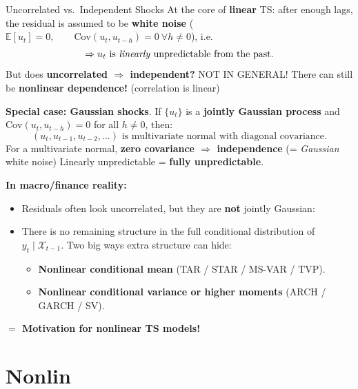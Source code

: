 \documentclass{beamer}
\begin{document}
\begin{frame}{Uncorrelated vs.\ Independent Shocks}
\footnotesize
At the core of \textbf{linear} TS: after enough lags, the residual is assumed to be \textbf{white noise} ($\mathbb{E}[u_t]=0, \qquad \text{Cov}(u_t,u_{t-h})=0 \ \forall h\neq 0$), i.e.
 \[
    \Rightarrow u_t \text{ is \emph{linearly} unpredictable from the past.}
  \]
But does \textbf{uncorrelated $\Rightarrow$ independent? }\pause NOT IN GENERAL! There can still be \textbf{nonlinear dependence!} (correlation is linear) 
\medskip

\textbf{Special case: Gaussian shocks}. If $\{u_t\}$ is a \textbf{jointly Gaussian process} and
        $\text{Cov}(u_t,u_{t-h})=0$ for all $h\neq 0$, then:
\[
          (u_t, u_{t-1}, u_{t-2},\dots) \text{ is multivariate normal with diagonal covariance.}
        \]
        For a multivariate normal, \textbf{zero covariance $\Rightarrow$ independence} (= \textit{Gaussian} white noise)
        Linearly unpredictable = \textbf{fully unpredictable}.

\pause
\medskip
\textbf{In macro/finance reality:}
\begin{itemize}
  \item Residuals often look uncorrelated, but they are \textbf{not} jointly Gaussian:
  \item There is no remaining structure in the full conditional distribution of \( y_t \mid \mathcal{X}_{t-1} \).
Two big ways extra structure can hide:
\begin{itemize}
\footnotesize
    \item \textbf{Nonlinear conditional mean} (TAR / STAR / MS-VAR / TVP).
    \item \textbf{Nonlinear conditional variance or higher moments} (ARCH / GARCH / SV).
\end{itemize}
\end{itemize}
\textbf{$=$ Motivation for nonlinear TS models!}
\end{frame}





















\section{Nonlin}
\end{document}
